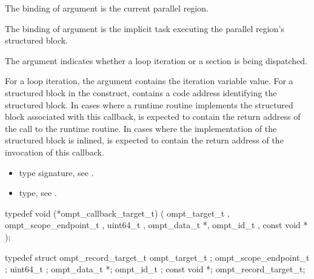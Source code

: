 \argdesc

The binding of argument  is the current
parallel region.

The binding of argument  is the implicit task
executing the parallel region's structured block.

The argument  indicates whether a loop iteration or a
section is being dispatched.

For a loop iteration, the argument  contains
the iteration variable value.  
For a structured block in the  construct, 
contains a code address identifying the structured block.  In cases where a
runtime routine implements the structured block associated with this callback,
 is expected to contain the return address of the
call to the runtime routine.  In cases where the implementation of
the structured block is inlined,  is expected to contain
the return address of the invocation of this callback.

\crossreferences
\begin{itemize}
\item {} type signature, see
  .
\item {} type, see
  .
\end{itemize}



\label{sec:ompt_callback_target_t}
\format

\begin{ccppspecific}
\begin{omptCallback}
typedef void (*ompt_callback_target_t) (
  ompt_target_t ,
  ompt_scope_endpoint_t ,
  uint64_t ,
  ompt_data_t *,
  ompt_id_t ,
  const void *
);
\end{omptCallback}
\end{ccppspecific}


\record

\begin{ccppspecific}
\begin{omptRecord}
typedef struct ompt_record_target_t {
  ompt_target_t ;
  ompt_scope_endpoint_t ;
  uint64_t ;
  ompt_data_t *;
  ompt_id_t ;
  const void *;
} ompt_record_target_t;
\end{omptRecord}
\end{ccppspecific}


